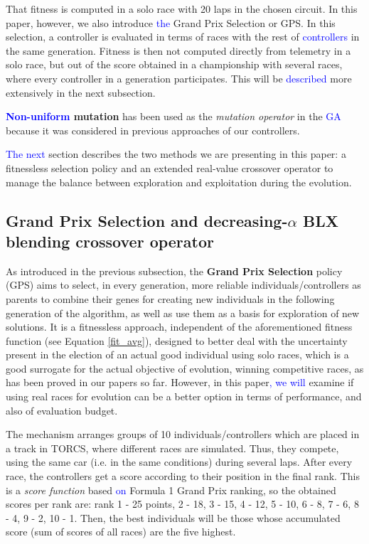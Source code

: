 \documentclass[10pt,journal,compsoc]{IEEEtran}
\begin{document}
That fitness is computed in a solo race with 20 laps in the chosen circuit. In this paper, however, we also introduce \textcolor{blue}{the} Grand Prix Selection or GPS. In this
selection, a controller is evaluated in terms of races with the rest
of \textcolor{blue}{controllers} in the same generation. Fitness is then not
computed directly from telemetry in a solo race, but out of the score
obtained in a championship with several races, where every controller
in a generation participates. This will be \textcolor{blue}{described} more extensively
in the next subsection.

\textbf{\textcolor{blue}{Non-uniform} mutation} \cite{mutation1997} has been used as the
\textit{mutation operator} in the \textcolor{blue}{GA} because it was considered in
previous approaches of our controllers. 

\textcolor{blue}{The next} section describes the two methods we are presenting in
this paper: a fitnessless selection policy and an extended real-value
crossover operator to manage the balance between exploration and
exploitation during the evolution. 

\subsection{Grand Prix Selection and decreasing-$\alpha$ BLX blending crossover operator}
\label{subsec:novel_operators}

As introduced in the previous subsection, the \textbf{Grand Prix Selection} policy (GPS)  aims to select, in every generation, more reliable individuals/controllers as parents to combine their genes for creating new individuals in the following generation of the algorithm, as well as use them as a basis for exploration of new solutions. It is a fitnessless approach,
independent of the aforementioned fitness function (see Equation
\ref{fit_avg}), designed to better deal with the uncertainty present
in the election of an actual good individual using solo races, which
is a good surrogate for the actual objective of evolution, winning
competitive races, as has been proved in our papers so far. However,
in this paper\textcolor{blue}{, we will} examine if using real races for evolution can be
a better option in terms of performance, and also of evaluation
budget. 

The mechanism arranges groups of 10 individuals/controllers which are placed in a track in TORCS, where different races are simulated. Thus, they compete, using the same car (i.e. in the same conditions) during several laps. After every race, the controllers get a score according to their position in the final rank. This is a \textit{score function} based \textcolor{blue}{on} Formula 1 Grand Prix ranking, so the obtained scores per rank are: rank 1 - 25 points, 2 - 18, 3 - 15, 4 - 12, 5 - 10, 6 - 8, 7 - 6, 8 - 4, 9 - 2, 10 - 1.
Then, the best individuals will be those whose accumulated score (sum of scores of all races) are the five highest.
\end{document}

